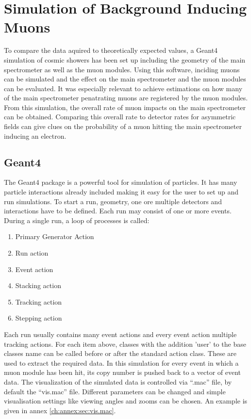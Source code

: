 
\chapter{Simulation of Background Inducing Muons}
\label{ch:Simulation of muon induced background}
  To compare the data aquired to theoretically expected values, a Geant4 \cite{geant} simulation of cosmic showers has been set up including the geometry of the main spectrometer as well as the muon modules. Using this software, inciding muons can be simulated and the effect on the main spectrometer and the muon modules can be evaluated. It was especially relevant to achieve estimations on how many of the main spectrometer penatrating muons are registered by the muon modules. From this simulation, the overall rate of muon impacts on the main spectrometer can be obtained. Comparing this overall rate to detector rates for asymmetric fields can give clues on the probability of a muon hitting the main spectrometer inducing an electron.
  \section{Geant4}
  \label{ch:Simulation software:sec:Geant4}
  The Geant4 package is a powerful tool for simulation of particles. It has many particle interactions already included making it easy for the user to set up and run simulations. To start a run, geometry, one ore multiple detectors and interactions have to be defined. Each run may consist of one or more events. During a single run, a loop of processes is called:
  \begin{enumerate}
  	\item Primary Generator Action
  	\item Run action
  	\item Event action
  	\item Stacking action
  	\item Tracking action
  	\item Stepping action
  \end{enumerate}
  Each run usually contains many event actions and every event action multiple tracking actions. For each item above, classes with the addition 'user' to the base classes name can be called before or after the standard action class. These are used to extract the required data. In this simulation for every event in which a muon module has been hit, its copy number is pushed back to a vector of event data. The visualization of the simulated data is controlled via ``.mac'' file, by default the ``vis.mac'' file. Different parameters can be changed and simple visualisation settings like viewing angles and zooms can be chosen. An example is given in annex \ref{ch:annex:sec:vis.mac}.
  


